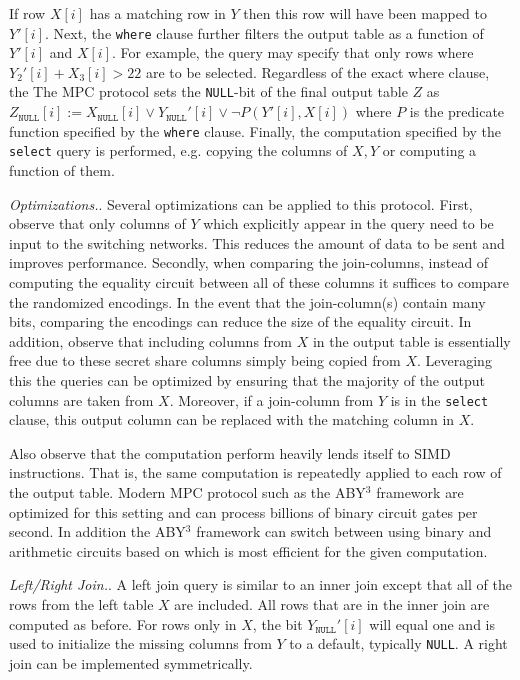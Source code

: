 \documentclass[11pt,letterpaper]{article}
\newcommand{\Null}{\texttt{NULL}\xspace}
\newcommand{\XNull}{\ensuremath{X_\Null}\xspace}
\newcommand{\YNull}{\ensuremath{Y_\Null}\xspace}
\newcommand{\ZNull}{\ensuremath{Z_\Null}\xspace}
\renewcommand{\paragraph}[1]{\vspace{0.1cm}\noindent\emph{#1}.}
\begin{document}
If row $X[i]$ has a matching row in $Y$ then this row will have been mapped to $Y'[i]$. Next, the \texttt{where} clause further filters the output table as a function of $Y'[i]$ and $X[i]$. 
\iffullversion
For example, the query may specify that only rows where $Y_2'[i] + X_3[i] > 22$  are to be selected. Regardless of the exact where clause, the 
\else 
The
\fi
MPC protocol sets the \texttt{NULL}-bit of the final output table $Z$ as $\ZNull[i] :=\XNull[i] \vee \YNull'[i] \vee \neg  P(Y'[i], X[i])$ where $P$ is the predicate function specified by the \texttt{where} clause.
Finally, the computation specified by the \texttt{select} query is performed, e.g. copying the columns of $X,Y$ or computing a function of them. 


\iffullversion
\paragraph{Optimizations.}
Several optimizations can be applied to this protocol. First, observe that only columns of $Y$ which explicitly appear in the query need to be input to the switching networks. This reduces the amount of data to be sent and improves performance. Secondly, when comparing the join-columns, instead of computing the equality circuit between all of these columns it suffices to compare the randomized encodings. In the event that the join-column(s) contain many bits, comparing the encodings can reduce the size of the equality circuit. In addition, observe that including columns from $X$ in the output table is essentially free due to these secret share columns simply being copied from $X$. Leveraging this the queries can be optimized by ensuring that the majority of the output columns are taken from $X$. Moreover, if a join-column from $Y$ is in the \texttt{select} clause, this output column can be replaced with the matching column in $X$.

Also observe that the computation perform heavily lends itself to SIMD instructions. That is, the same computation is repeatedly applied to each row of the output table. Modern MPC protocol such as the ABY$^3$ framework \cite{aby3,highthroughput} are optimized for this setting and can process billions of binary circuit gates per second\cite{highthroughput}. In addition the ABY$^3$ framework can switch between using binary and arithmetic circuits based on which is most efficient for the given computation. 
\fi

\paragraph{Left/Right Join.}
A left join query is similar to an inner join except that all of the rows from the left table $X$ are included. All rows that are in the inner join are computed as before. For rows only in $X$, the bit $\YNull'[i]$ will equal one and is used to initialize the missing columns from $Y$ to a default, typically \texttt{NULL}. A right join can be implemented symmetrically.
\end{document}
